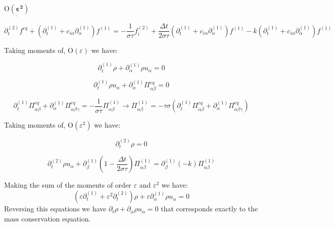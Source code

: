 \documentclass{article}
\newcommand{\Omicron}{\mathrm{O}}
\begin{document}
$\underline{\boldsymbol{\Omicron ( \varepsilon^2 )}}$

\begin{equation*}
    \partial _{t}^{( 2)} f^{eq} +\left( \partial _{t}^{( 1)} +c_{i\alpha } \partial _{\alpha }^{( 1)}\right) f^{( 1)} =-\frac{1}{\sigma\tau } f_{i}^{( 2)} +\frac{\Delta t}{2\sigma\tau }\left( \partial _{t}^{( 1)} +c_{i\alpha } \partial _{\alpha }^{( 1)}\right) f^{( 1)} -k\left( \partial _{t}^{( 1)} +c_{i\alpha } \partial _{\alpha }^{( 1)}\right) f^{( 1)}
\end{equation*}

Taking moments of, $\Omicron ( \varepsilon )$ we have:

\begin{equation*}
    \partial _{t}^{( 1)} \rho +\partial _{\alpha }^{( 1)} \rho u_{\alpha } =0
\end{equation*}

\begin{equation*}
    \partial _{t}^{( 1)} \rho u_{\alpha } +\partial _{\alpha }^{( 1)}\mathit{\Pi }_{\alpha \beta }^{eq} =0
\end{equation*}

\begin{equation*}
    \partial _{t}^{( 1)}\mathit{\Pi }_{\alpha \beta }^{eq} +\partial _{\alpha }^{( 1)}\mathit{\Pi }_{\alpha \beta \gamma }^{eq} =-\frac{1}{\sigma\tau } \mathit{\Pi }_{\alpha \beta }^{( 1)}\rightarrow \mathit{\Pi }_{\alpha \beta }^{( 1)} =-{\tau\sigma} \left( \partial _{t}^{( 1)}\mathit{\Pi }_{\alpha \beta }^{eq} +\partial _{\alpha }^{( 1)}\mathit{\Pi }_{\alpha \beta \gamma }^{eq}\right)
\end{equation*}

Taking moments of, $\Omicron ( \varepsilon^2 )$ we have: 

\begin{equation*}
    \partial _{t}^{( 2)} \rho =0
\end{equation*}

\begin{equation*}
    \partial _{t}^{( 2)} \rho u_{\alpha } +\partial _{\beta }^{( 1)}\left( 1-\frac{\Delta t}{2\sigma\tau }\right)\mathit{\Pi }_{\alpha \beta }^{( 1)} =\partial _{\beta }^{( 1)}( -k)\mathit{\Pi }_{\alpha \beta }^{( 1)}
\end{equation*}

Making the sum of the moments of order $\varepsilon$ and $\varepsilon^2$ we have:
\begin{equation*}
    \left( \varepsilon \partial _{t}^{( 1)} +\varepsilon ^{2} \partial _{t}^{( 2)}\right) \rho +\varepsilon \partial _{\alpha }^{( 1)} \rho u_{\alpha } =0
\end{equation*}
Reversing this equations we have $\partial _{t} \rho +\partial _{\alpha } \rho u_{\alpha } =0$ that corresponds exactly to the mass conservation equation.
\end{document}
